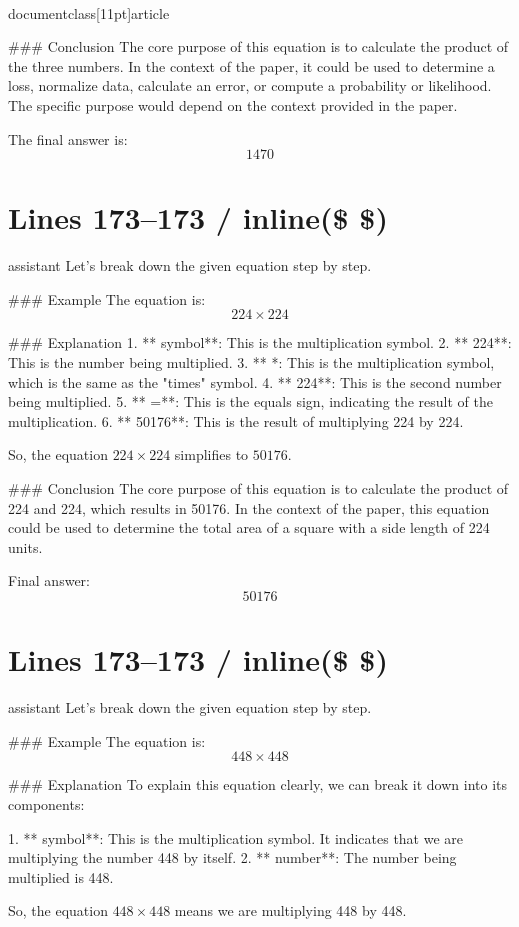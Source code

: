 \\documentclass[11pt]{article}
\begin{document}
### Conclusion
The core purpose of this equation is to calculate the product of the three numbers. In the context of the paper, it could be used to determine a loss, normalize data, calculate an error, or compute a probability or likelihood. The specific purpose would depend on the context provided in the paper.

The final answer is:
\[
\boxed{1470}
\]


\section*{Lines 173–173 / inline(\$ \$) }
assistant
Let's break down the given equation step by step.

### Example
The equation is:
\[ 224 \times 224 \]

### Explanation
1. ** symbol**: This is the multiplication symbol.
2. ** 224**: This is the number being multiplied.
3. ** \times**: This is the multiplication symbol, which is the same as the "times" symbol.
4. ** 224**: This is the second number being multiplied.
5. ** =**: This is the equals sign, indicating the result of the multiplication.
6. ** 50176**: This is the result of multiplying 224 by 224.

So, the equation \( 224 \times 224 \) simplifies to \( 50176 \).

### Conclusion
The core purpose of this equation is to calculate the product of 224 and 224, which results in 50176. In the context of the paper, this equation could be used to determine the total area of a square with a side length of 224 units.

Final answer:
\[
\boxed{50176}
\]


\section*{Lines 173–173 / inline(\$ \$) }
assistant
Let's break down the given equation step by step.

### Example
The equation is:
\[ 448 \times 448 \]

### Explanation
To explain this equation clearly, we can break it down into its components:

1. ** symbol**: This is the multiplication symbol. It indicates that we are multiplying the number 448 by itself.
2. ** number**: The number being multiplied is 448.

So, the equation \( 448 \times 448 \) means we are multiplying 448 by 448.
\end{document}
